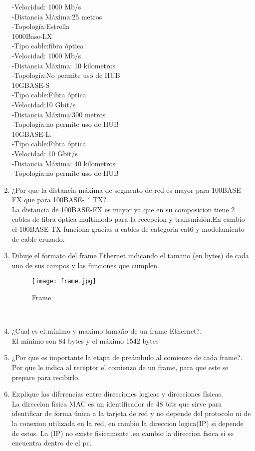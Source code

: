 \documentclass{udparticle}
\begin{document}
\begin{enumerate}
        -Velocidad: 1000 Mb/s\\
        -Distancia Máxima:25 metros\\
        -Topología:Estrella\\ 
    1000Base-LX\\
        -Tipo cable:fibra óptica\\
        -Velocidad: 1000 Mb/s\\
        -Distancia Máxima: 10 kilometros\\
        -Topología:No permite uso de HUB\\
    10GBASE-S\\
        -Tipo cable:Fibra óptica\\
        -Velocidad:10 Gbit/s\\
        -Distancia Máxima:300 metros\\
        -Topología:no permite uso de HUB\\
    10GBASE-L.\\
        -Tipo cable:Fibra óptica\\
        -Velocidad:  10 Gbit/s\\
        -Distancia Máxima: 40 kilometros\\
        -Topología:no permite uso de HUB\\

\item ¿Por que la distancia máxima de segmento de red es mayor para 100BASE-FX que para 100BASE- ´
TX?.\\
  La distancia de 100BASE-FX es mayor ya que en su composicion tiene 2 cables de fibra óptica multimodo para la recepcion y
  transmisión.En cambio el 100BASE-TX funciona gracias a cables de categoria cat6 y modelamiento de cable cruzado.

\item Dibuje el formato del frame Ethernet indicando el tamano (en bytes) de cada uno de sus campos
y las funciones que cumplen.\\
\begin{figure}[H]
	\centering
	\texttt{[image: frame.jpg]}
	\caption{Frame}
\end{figure}\\
\item ¿Cual es el mínimo y maximo tamaño de un frame Ethernet?.\\
    El mínimo son 84 bytes y el máximo 1542 bytes
\item ¿Por que es importante la etapa de preámbulo al comienzo de cada frame?.\\
    Por que le indica al receptor el comienzo de un frame, para que este se prepare para recibirlo.
\item Explique las diferencias entre direcciones logicas y direcciones físicas.\\
    La direccion física MAC es un identificador de 48 bits que sirve para identificar de forma única a la tarjeta de red y no depende 
    del protocolo ni de la conexion utilizada en la red, en cambio la direccion logica(IP) si depende de estos.
    La (IP) no existe fisicamente ,en cambio la direccion fisica si se encuentra dentro de el pc.\\


\end{enumerate}
\end{document}
